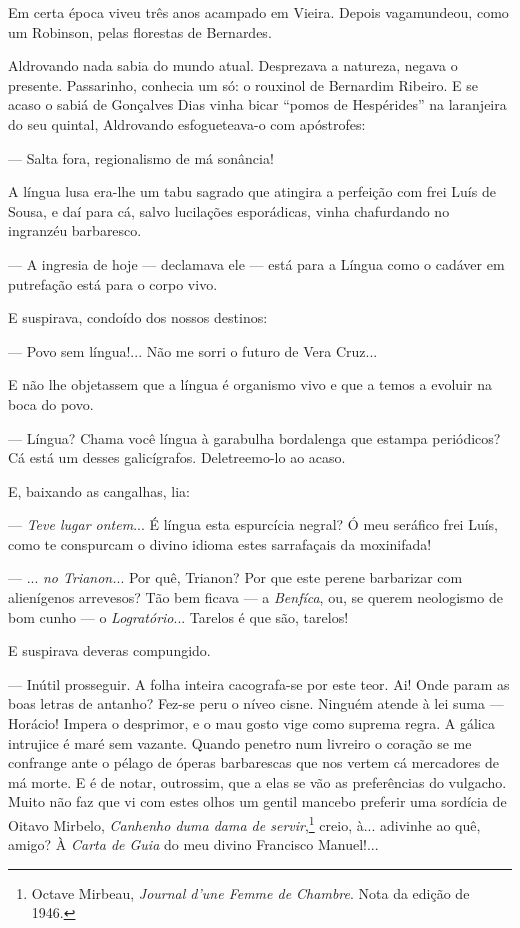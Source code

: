 Em certa época viveu três anos acampado em Vieira. Depois vagamundeou,
como um Robinson, pelas florestas de Bernardes.

Aldrovando nada sabia do mundo atual. Desprezava a natureza, negava o
presente. Passarinho, conhecia um só: o rouxinol de Bernardim Ribeiro. E
se acaso o sabiá de Gonçalves Dias vinha bicar ``pomos de Hespérides''
na laranjeira do seu quintal, Aldrovando esfogueteava-o com apóstrofes:

--- Salta fora, regionalismo de má sonância!

A língua lusa era-lhe um tabu sagrado que atingira a perfeição com frei
Luís de Sousa, e daí para cá, salvo lucilações esporádicas, vinha
chafurdando no ingranzéu barbaresco.

--- A ingresia de hoje --- declamava ele --- está para a Língua como o
cadáver em putrefação está para o corpo vivo.

E suspirava, condoído dos nossos destinos:

--- Povo sem língua!... Não me sorri o futuro de Vera Cruz...

E não lhe objetassem que a língua é organismo vivo e que a temos a
evoluir na boca do povo.

--- Língua? Chama você língua à garabulha bordalenga que estampa
periódicos? Cá está um desses galicígrafos. Deletreemo-lo ao acaso.

E, baixando as cangalhas, lia:

--- \emph{Teve lugar ontem}... É língua esta espurcícia negral? Ó meu
seráfico frei Luís, como te conspurcam o divino idioma estes sarrafaçais
da moxinifada!

--- ... \emph{no Trianon.}.. Por quê, Trianon? Por que este perene
barbarizar com alienígenos arrevesos? Tão bem ficava --- a
\emph{Benfíca}, ou, se querem neologismo de bom cunho --- o
\emph{Logratório}... Tarelos é que são, tarelos!

E suspirava deveras compungido.

--- Inútil prosseguir. A folha inteira cacografa-se por este teor. Ai!
Onde param as boas letras de antanho? Fez-se peru o níveo cisne. Ninguém
atende à lei suma --- Horácio! Impera o desprimor, e o mau gosto vige
como suprema regra. A gálica intrujice é maré sem vazante. Quando
penetro num livreiro o coração se me confrange ante o pélago de óperas
barbarescas que nos vertem cá mercadores de má morte. E é de notar,
outrossim, que a elas se vão as preferências do vulgacho. Muito não faz
que vi com estes olhos um gentil mancebo preferir uma sordícia de Oitavo
Mirbelo, \emph{Canhenho duma dama de servir},\footnote{Octave Mirbeau,
  \emph{Journal d'une Femme de Chambre}. Nota da edição de 1946.} creio,
à... adivinhe ao quê, amigo? À \emph{Carta de Guia} do meu divino
Francisco Manuel!...

